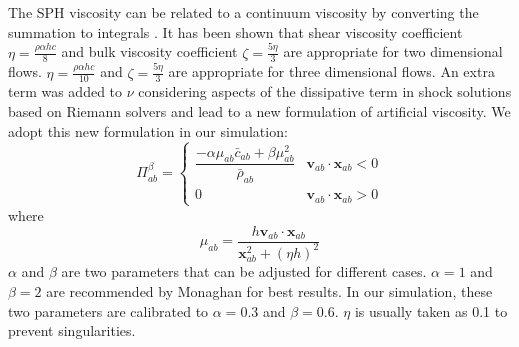 \documentclass[gmd, manuscript]{copernicus}
\begin{document}
The SPH viscosity can be related to a continuum viscosity by converting the summation to integrals \citep{monaghan2005smoothed}. It has been shown that  shear viscosity coefficient $\eta = \frac{\rho \alpha h c}{8} $ and bulk viscosity coefficient $ \zeta = \frac{5 \eta}{3}$ are appropriate for two dimensional flows. $\eta = \frac{\rho \alpha h c}{10} $ and $ \zeta = \frac{5 \eta}{3}$ are appropriate for three dimensional flows.
An extra term was added to $\nu$ considering aspects of the dissipative term in shock solutions based on Riemann solvers and lead to a new formulation of artificial viscosity. We adopt this new formulation in our simulation:
\begin{equation}
\Pi_{ab}^{\beta} = 
\begin{cases} 
      \dfrac{- \alpha \mu_{ab} \bar{c}_{ab} + \beta \mu_{ab}^2} {\bar{\rho}_{ab}} & \textbf{v}_{ab} \cdot \textbf{x}_{ab} < 0\\
      0 & \textbf{v}_{ab} \cdot \textbf{x}_{ab} > 0
\end{cases}
\label{eq:art-vis-shock}
\end{equation}
where
\begin{equation}
\mu_{ab} = \dfrac{h \textbf{v}_{ab} \cdot \textbf{x}_{ab}}{\textbf{x}_{ab}^2 + \left(\eta h\right)^2} 
\end{equation}
$\alpha$ and $\beta$ are two parameters that can be adjusted for different cases.
$\alpha = 1$ and $\beta = 2$ are  recommended by Monaghan for best results. In our simulation, these two parameters are calibrated to  $\alpha = 0.3$ and $\beta = 0.6$. $\eta$ is usually taken as 0.1 to prevent singularities.
\end{document}
